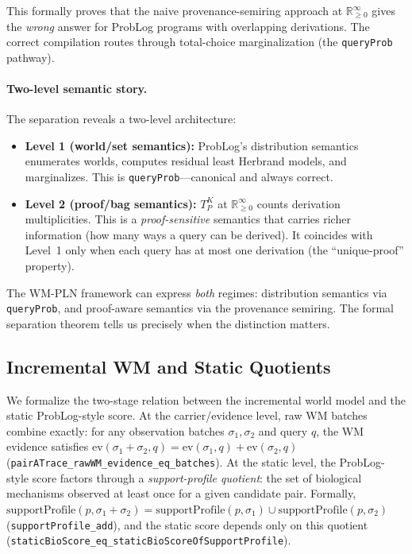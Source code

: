 \documentclass[]{article}
\newcommand{\code}[1]{\texttt{#1}}
\begin{document}
\noindent
This formally proves that the naive provenance-semiring approach at
$\mathbb{R}_{\ge 0}^\infty$ gives the \emph{wrong} answer for ProbLog
programs with overlapping derivations.  The correct compilation routes
through total-choice marginalization (the \code{queryProb} pathway).

\paragraph{Two-level semantic story.}
The separation reveals a two-level architecture:
\begin{itemize}
\item \textbf{Level 1 (world/set semantics):} ProbLog's distribution semantics
  enumerates worlds, computes residual least Herbrand models, and marginalizes.
  This is \code{queryProb}---canonical and always correct.
\item \textbf{Level 2 (proof/bag semantics):} $T_P^K$ at $\mathbb{R}_{\ge 0}^\infty$
  counts derivation multiplicities.  This is a \emph{proof-sensitive} semantics
  that carries richer information (how many ways a query can be derived).
  It coincides with Level~1 only when each query has at most one derivation
  (the ``unique-proof'' property).
\end{itemize}
The WM-PLN framework can express \emph{both} regimes:
distribution semantics via \code{queryProb},
and proof-aware semantics via the provenance semiring.
The formal separation theorem tells us precisely when the distinction matters.

\subsection{Incremental WM and Static Quotients}
\label{sec:incremental}

We formalize the two-stage relation between the incremental world model and the
static ProbLog-style score.  At the carrier/evidence level, raw WM batches
combine exactly: for any observation batches $\sigma_1, \sigma_2$ and query $q$,
the WM evidence satisfies $\mathrm{ev}(\sigma_1 + \sigma_2, q) =
\mathrm{ev}(\sigma_1, q) + \mathrm{ev}(\sigma_2, q)$
(\code{pairATrace\_rawWM\_evidence\_eq\_batches}).
At the static level, the ProbLog-style score factors through a
\emph{support-profile quotient}: the set of biological mechanisms observed
at least once for a given candidate pair.  Formally,
$\mathrm{supportProfile}(p, \sigma_1 + \sigma_2) =
\mathrm{supportProfile}(p, \sigma_1) \cup \mathrm{supportProfile}(p, \sigma_2)$
(\code{supportProfile\_add}), and the static score depends only on this quotient
(\code{staticBioScore\_eq\_staticBioScoreOfSupportProfile}).
\end{document}
